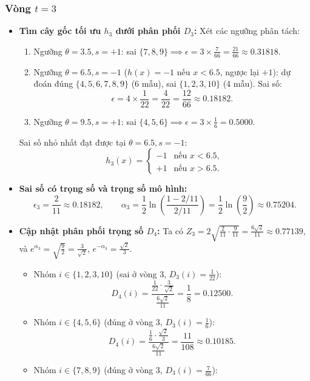 \documentclass[11pt, a4paper]{article}
\begin{document}
\subsubsection*{Vòng $t = 3$}
\begin{itemize}
    \item \textbf{Tìm cây gốc tối ưu $h_3$ dưới phân phối $D_3$:}
    Xét các ngưỡng phân tách:
    \begin{enumerate}
        \item Ngưỡng $\theta = 3.5, s = +1$: sai $\{7, 8, 9\} \implies \epsilon = 3 \times \frac{7}{66} = \frac{21}{66} \approx 0.31818$.
        \item Ngưỡng $\theta = 6.5, s = -1$ ($h(x) = -1$ nếu $x < 6.5$, ngược lại $+1$): dự đoán đúng $\{4, 5, 6, 7, 8, 9\}$ (6 mẫu), sai $\{1, 2, 3, 10\}$ (4 mẫu). Sai số:
        \[
        \epsilon = 4 \times \frac{1}{22} = \frac{4}{22} = \frac{12}{66} \approx 0.18182.
        \]
        \item Ngưỡng $\theta = 9.5, s = +1$: sai $\{4, 5, 6\} \implies \epsilon = 3 \times \frac{1}{6} = 0.5000$.
    \end{enumerate}
    Sai số nhỏ nhất đạt được tại $\theta = 6.5, s = -1$:
    \[
    h_3(x) = \begin{cases} -1 & \text{nếu } x < 6.5, \\ +1 & \text{nếu } x > 6.5. \end{cases}
    \]
    \item \textbf{Sai số có trọng số và trọng số mô hình:}
    \[
    \epsilon_3 = \frac{2}{11} \approx 0.18182, \qquad \alpha_3 = \frac{1}{2}\ln\left(\frac{1 - 2/11}{2/11}\right) = \frac{1}{2}\ln\left(\frac{9}{2}\right) \approx 0.75204.
    \]
    \item \textbf{Cập nhật phân phối trọng số $D_4$:}
    Ta có $Z_3 = 2\sqrt{\frac{2}{11} \cdot \frac{9}{11}} = \frac{6\sqrt{2}}{11} \approx 0.77139$, và $e^{\alpha_3} = \sqrt{\frac{9}{2}} = \frac{3}{\sqrt{2}}$, $e^{-\alpha_3} = \frac{\sqrt{2}}{3}$.
    \begin{itemize}
        \item Nhóm $i \in \{1, 2, 3, 10\}$ (sai ở vòng 3, $D_3(i) = \frac{1}{22}$):
        \[
        D_4(i) = \frac{\frac{1}{22} \cdot \frac{3}{\sqrt{2}}}{\frac{6\sqrt{2}}{11}} = \frac{1}{8} = 0.12500.
        \]
        \item Nhóm $i \in \{4, 5, 6\}$ (đúng ở vòng 3, $D_3(i) = \frac{1}{6}$):
        \[
        D_4(i) = \frac{\frac{1}{6} \cdot \frac{\sqrt{2}}{3}}{\frac{6\sqrt{2}}{11}} = \frac{11}{108} \approx 0.10185.
        \]
        \item Nhóm $i \in \{7, 8, 9\}$ (đúng ở vòng 3, $D_3(i) = \frac{7}{66}$):

\end{itemize}
\end{itemize}
\end{document}

